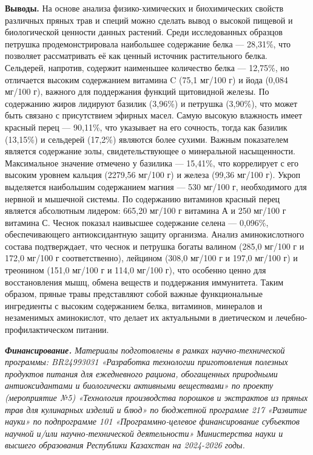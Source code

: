 \begin{multicols}{2}
{\bfseries Выводы.} На основе анализа физико-химических и биохимических
свойств различных пряных трав и специй можно сделать вывод о высокой
пищевой и биологической ценности данных растений. Среди исследованных
образцов петрушка продемонстрировала наибольшее содержание белка ---
28,31\%, что позволяет рассматривать её как ценный источник
растительного белка. Сельдерей, напротив, содержит наименьшее количество
белка --- 12,75\%, но отличается высоким содержанием витамина C (75,1
мг/100 г) и йода (0,084 мг/100 г), важного для поддержания функций
щитовидной железы. По содержанию жиров лидируют базилик (3,96\%) и
петрушка (3,90\%), что может быть связано с присутствием эфирных масел.
Самую высокую влажность имеет красный перец --- 90,11\%, что указывает
на его сочность, тогда как базилик (13,15\%) и сельдерей (17,2\%)
являются более сухими. Важным показателем является содержание золы,
свидетельствующее о минеральной насыщенности. Максимальное значение
отмечено у базилика --- 15,41\%, что коррелирует с его высоким уровнем
кальция (2279,56 мг/100 г) и железа (99,36 мг/100 г). Укроп выделяется
наибольшим содержанием магния --- 530 мг/100 г, необходимого для нервной
и мышечной системы. По содержанию витаминов красный перец является
абсолютным лидером: 665,20 мг/100 г витамина А и 250 мг/100 г витамина
С. Чеснок показал наивысшее содержание селена --- 0,096\%,
обеспечивающего антиоксидантную защиту организма. Анализ аминокислотного
состава подтверждает, что чеснок и петрушка богаты валином (285,0 мг/100
г и 172,0 мг/100 г соответственно), лейцином (308,0 мг/100 г и 197,0
мг/100 г) и треонином (151,0 мг/100 г и 114,0 мг/100 г), что особенно
ценно для восстановления мышц, обмена веществ и поддержания иммунитета.
Таким образом, пряные травы представляют собой важные функциональные
ингредиенты с высоким содержанием белка, витаминов, минералов и
незаменимых аминокислот, что делает их актуальными в диетическом и
лечебно-профилактическом питании.

\emph{{\bfseries Финансирование.} Материалы подготовлены в рамках
научно-технической программы: BR24993031 «Разработка технологии
приготовления полезных продуктов питания для ежедневного рациона,
обогащенных природными антиоксидантами и биологически активными
веществами» по проекту (мероприятие №5) «Технология производства
порошков и экстрактов из пряных трав для кулинарных изделий и блюд» по
бюджетной программе 217 «Развитие науки» по подпрограмме 101
«Программно-целевое финансирование субъектов научной и/или
научно-технической деятельности» Министерства науки и высшего
образования Республики Казахстан на 2024-2026 годы.}
\end{multicols}

